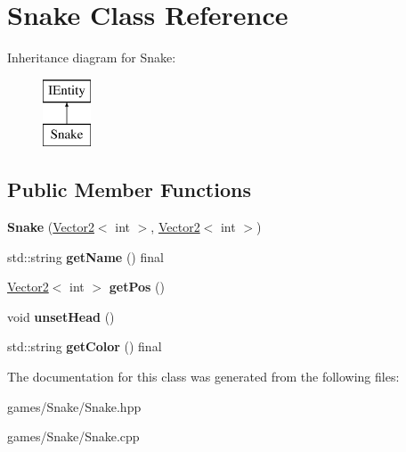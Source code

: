 \hypertarget{class_snake}{}\section{Snake Class Reference}
\label{class_snake}
Inheritance diagram for Snake\+:\begin{figure}[H]
\begin{center}
\leavevmode
\includegraphics[height=2.000000cm]{class_snake}
\end{center}
\end{figure}
\subsection*{Public Member Functions}
\begin{DoxyCompactItemize}
\item 
\mbox{\label{class_snake_a8b14a5c95a9b8106099bde83661e155e}} 
{\bfseries Snake} (\hyperlink{struct_vector2}{Vector2}$<$ int $>$, \hyperlink{struct_vector2}{Vector2}$<$ int $>$)
\item 
\mbox{\label{class_snake_acf2312330dfcba505eb0bec22356ab7b}} 
std\+::string {\bfseries get\+Name} () final
\item 
\mbox{\label{class_snake_a0fce62d24714f5b27ad923beaf29c513}} 
\hyperlink{struct_vector2}{Vector2}$<$ int $>$ {\bfseries get\+Pos} ()
\item 
\mbox{\label{class_snake_aaa3246451a2e7ff9f2674c640fd54391}} 
void {\bfseries unset\+Head} ()
\item 
\mbox{\label{class_snake_a84c432b662c23261d889a36708522d57}} 
std\+::string {\bfseries get\+Color} () final
\end{DoxyCompactItemize}


The documentation for this class was generated from the following files\+:\begin{DoxyCompactItemize}
\item 
games/\+Snake/Snake.\+hpp\item 
games/\+Snake/Snake.\+cpp\end{DoxyCompactItemize}
